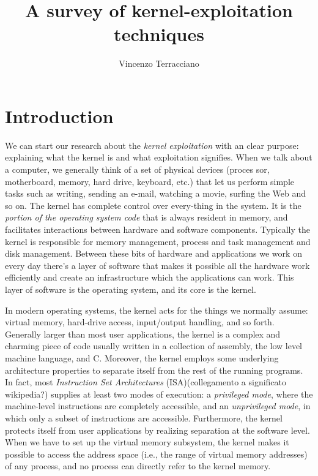 \documentclass{masterthesis}
\begin{document}
\title{A survey of kernel-exploitation techniques}

\author{Vincenzo Terracciano}


\examiner{_______ ______}

\maketitle

\tableofcontents

\chapter{Introduction}

We can start our research about the \emph{kernel exploitation} with an clear purpose: explaining what the kernel is and what exploitation signifies.
When we talk about a computer, we generally think of a set of physical devices (proces sor, motherboard, memory, hard drive, keyboard, etc.) that let us  perform simple tasks such as writing, sending an e-mail, watching a movie, surfing the Web and so on. 
The kernel has complete control over every-thing in the system. It is the \emph{portion of the operating system code} that is always resident in memory, and facilitates interactions between hardware and software components.
Typically the kernel is responsible for memory management, process and task management and disk management.
Between these bits of hardware and applications we work on every day there's a layer of software that makes it possible all the hardware work efficiently and create an infrastructure which the applications can work.
This layer of software is the operating system, and its core is the kernel.

In modern operating systems, the kernel acts for the things we normally assume: virtual memory, hard-drive access, input/output handling, and so forth. Generally larger than most user applications, the kernel is a complex and charming piece of code usually written in a collection of assembly, the low level machine language, and C. 
Moreover, the kernel employs some underlying architecture properties to separate itself from the rest of the running programs.
In fact, most \emph{Instruction Set Architectures} (ISA)(collegamento a significato wikipedia?) supplies at least two modes of execution: a \emph{privileged mode}, where the machine-level instructions are completely accessible, and an \emph{unprivileged mode}, in which only a subset of instructions are accessible. 
Furthermore, the kernel protects itself from user applications by realizing separation at the software level.
When we have to set up the virtual memory subsystem, the kernel makes it possible to access the address space (i.e., the range of virtual memory addresses) of any process, and no process can directly refer to the kernel memory.
\end{document}
